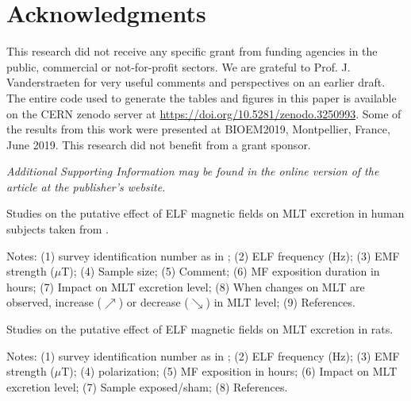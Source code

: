 \documentclass[letter,twoside]{article}
\begin{document}
 
  
 
 

\section*{Acknowledgments}
This research did not receive any specific grant from funding
agencies in the public, commercial or not-for-profit sectors.
We are grateful to Prof. J. Vanderstraeten for very useful comments and perspectives on an earlier draft.
The entire code used to generate the tables and figures in this paper is available on the CERN zenodo server at \url{
https://doi.org/10.5281/zenodo.3250993}.
Some of the results from this work were presented at BIOEM2019, Montpellier, France, June 2019. This research did not benefit from a grant sponsor.


{\it Additional Supporting Information may be found in the online version of the article at the publisher’s website.}


 




\begin{sidewaystable*}
\small

\caption{Studies on the putative effect of ELF magnetic fields on MLT excretion in human subjects taken from \citet{Halgamuge2013}. 
}
\label{table:halga}
Notes: 
(1) survey identification number as in \citet{Halgamuge2013}; (2) ELF frequency (Hz); (3) EMF strength ($\mu$T);
(4) Sample size; 
 (5) Comment; (6) MF exposition duration in hours; (7) Impact on MLT excretion level; (8) When changes  on MLT are observed, increase ($\nearrow$) or decrease ($\searrow$) in MLT level;  (9) References.
\end{sidewaystable*}



\begin{sidewaystable*}
\small
 
\caption{Studies on the putative effect of ELF magnetic fields on MLT excretion in rats. 
}
\label{table:rats}
Notes: 
(1) survey identification number as in \citet{Jahandideh2010}; (2) ELF frequency (Hz); (3) EMF strength ($\mu$T); (4) polarization; (5) MF exposition in hours; (6) Impact on MLT excretion level; (7) Sample exposed/sham; (8) References.
\end{sidewaystable*}
\end{document}
